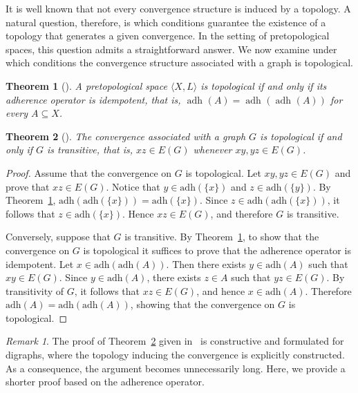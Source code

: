 \documentclass{amsart}
\newcommand{\adh}[2]{\operatorname{adh}_{#1}\left(#2\right)}
\newtheorem{theorem}{Theorem}[section]
\theoremstyle{definition}
\theoremstyle{remark}
\newtheorem{remark}{Remark}[section]
\numberwithin{equation}{section}
\begin{document}
It is well known that not every convergence structure is induced by a topology. A natural question, therefore, is which conditions guarantee the existence of a topology that generates a given convergence.
In the setting of pretopological spaces, this question admits a straightforward answer. We now examine under which conditions the convergence structure associated with a graph is topological.


\begin{theorem}[{\cite[Proposition V.4.4]{DM}}]
	\label{adh}
A pretopological space $\langle X, L \rangle$ is topological if and only if its adherence operator is idempotent, that is,
$\adh{}{A}=\adh{}{\adh{}{A}}$ for every $A\subseteq X$.
\end{theorem}

\begin{theorem}[{\cite[Proposition 3.11]{probconv}}]
The convergence associated with a graph $G$ is topological if and only if $G$ is transitive, 
that is, $xz\in E(G)$ whenever $xy,yz\in E(G)$.
	\label{top}
\end{theorem}
\begin{proof}
Assume that the convergence on $G$ is topological. Let $xy,yz\in E(G)$ and prove that $xz\in E(G)$. 
Notice that $y\in \mathrm{adh}(\{x\})$ and $z\in \mathrm{adh}(\{y\})$. 
By Theorem~\ref{adh}, $\mathrm{adh}(\mathrm{adh}(\{x\}))=\mathrm{adh}(\{x\})$. Since 
$z\in \mathrm{adh}(\mathrm{adh}(\{x\}))$, it follows that $z\in \mathrm{adh}(\{x\})$. 
Hence $xz\in E(G)$, and therefore $G$ is transitive.
	
	Conversely, suppose that $G$ is transitive. By Theorem~\ref{adh}, to show that the convergence on $G$ is topological it suffices to prove that the adherence operator is idempotent. 
	Let $x\in \mathrm{adh}(\mathrm{adh}(A))$. Then there exists $y\in \mathrm{adh}(A)$ such that $xy\in E(G)$. 
	Since $y\in \mathrm{adh}(A)$, there exists $z\in A$ such that $yz\in E(G)$. 
	By transitivity of $G$, it follows that $xz\in E(G)$, and hence $x\in \mathrm{adh}(A)$. 
	Therefore $\mathrm{adh}(A)=\mathrm{adh}(\mathrm{adh}(A))$, showing that the convergence on $G$ is topological.
\end{proof}

\begin{remark}
The proof of Theorem~\ref{top} given in~\cite{probconv} is constructive and formulated for digraphs, where the topology inducing the convergence is explicitly constructed. As a consequence, the argument becomes unnecessarily long. 
Here, we provide a shorter proof based on the adherence operator.
\end{remark}
\end{document}
